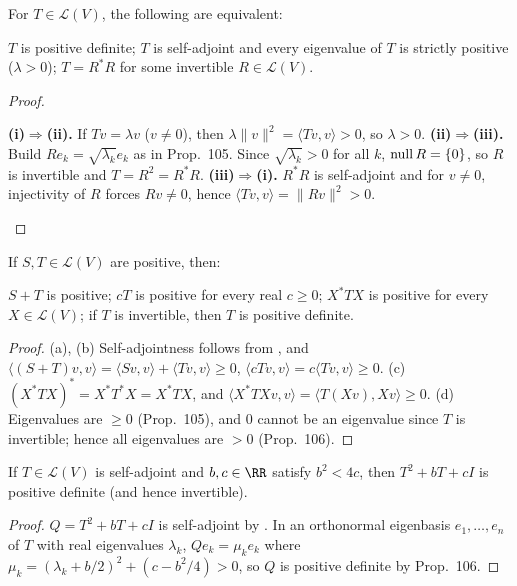 \documentclass[10pt]{scrartcl}
\newcommand{\LL}{\mathcal L}\newcommand{\PP}{\mathcal P}\newcommand{\MM}{\mathcal M}
\begin{document}
\begin{proposition*}
  For $T\in\LL(V)$, the following are equivalent:
  \begin{enumerate}
    \ii[(i)] $T$ is positive definite;
    \ii[(ii)] $T$ is self-adjoint and every eigenvalue of $T$ is strictly positive ($\lambda>0$);
    \ii[(iii)] $T=R^*R$ for some invertible $R\in\LL(V)$.
  \end{enumerate}
\end{proposition*}
\begin{proof}
  \begin{steps}
    \ii \textbf{(i)$\Rightarrow$(ii).} If $Tv=\lambda v$ ($v\neq0$), then $\lambda\|v\|^2=\langle Tv,v\rangle>0$, so $\lambda>0$.
    \ii \textbf{(ii)$\Rightarrow$(iii).} Build $Re_k=\sqrt{\lambda_k}e_k$ as in Prop.~105. Since $\sqrt{\lambda_k}>0$ for all $k$, $\operatorname{null} R=\{0\}$, so $R$ is invertible  and $T=R^2=R^*R$.
    \ii \textbf{(iii)$\Rightarrow$(i).} $R^*R$ is self-adjoint and for $v\neq0$, injectivity of $R$ forces $Rv\neq0$, hence $\langle Tv,v\rangle=\|Rv\|^2>0$.
  \end{steps}
\end{proof}

\begin{proposition*}
  If $S,T\in\LL(V)$ are positive, then:
  \begin{enumerate}[(a)]
    \ii $S+T$ is positive;
    \ii $cT$ is positive for every real $c\ge0$;
    \ii $X^*TX$ is positive for every $X\in\LL(V)$;
    \ii if $T$ is invertible, then $T$ is positive definite.
  \end{enumerate}
\end{proposition*}
\begin{proof}
  (a), (b) Self-adjointness follows from , and $\langle(S+T)v,v\rangle=\langle Sv,v\rangle+\langle Tv,v\rangle\ge0$, $\langle cTv,v\rangle=c\langle Tv,v\rangle\ge0$.
  (c) $(X^*TX)^*=X^*T^*X=X^*TX$, and $\langle X^*TXv,v\rangle=\langle T(Xv),Xv\rangle\ge0$.
  (d) Eigenvalues are $\ge0$ (Prop.~105), and $0$ cannot be an eigenvalue since $T$ is invertible; hence all eigenvalues are $>0$ (Prop.~106).
\end{proof}

\begin{proposition*}
  If $T\in\LL(V)$ is self-adjoint and $b,c\in\RR$ satisfy $b^2<4c$, then $T^2+bT+cI$ is positive definite (and hence invertible).
\end{proposition*}
\begin{proof}
  $Q=T^2+bT+cI$ is self-adjoint by . In an orthonormal eigenbasis $e_1,\dots,e_n$ of $T$ with real eigenvalues $\lambda_k$, $Qe_k = \mu_k e_k$ where $\mu_k = (\lambda_k+b/2)^2 + (c-b^2/4) > 0$, so $Q$ is positive definite by Prop.~106.
\end{proof}
\end{document}
